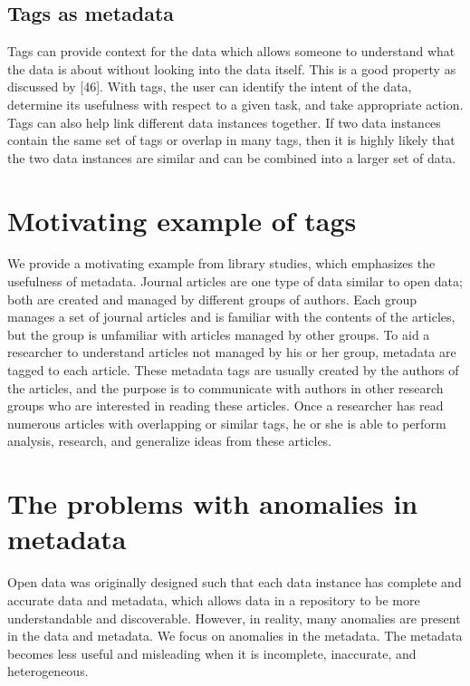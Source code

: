 \subsection{Tags as metadata}

Tags can provide context for the data which allows someone to understand what the data is about without looking into the data itself. This is a good property as discussed by [46]. With tags, the user can identify the intent of the data, determine its usefulness with respect to a given task, and take appropriate action. Tags can also help link different data instances together. If two data instances contain the same set of tags or overlap in many tags, then it is highly likely that the two data instances are similar and can be combined into a larger set of data.


\section{Motivating example of tags}
\label{sec:MotivatingExampleOfTags}

We provide a motivating example from library studies, which emphasizes the usefulness of metadata. Journal articles are one type of data similar to open data; both are created and managed by different groups of authors. Each group manages a set of journal articles and is familiar with the contents of the articles, but the group is unfamiliar with articles managed by other groups. To aid a researcher to understand articles not managed by his or her group, metadata are tagged to each article. These metadata tags are usually created by the authors of the articles, and the purpose is to communicate with authors in other research groups who are interested in reading these articles. Once a researcher has read numerous articles with overlapping or similar tags, he or she is able to perform analysis, research, and generalize ideas from these articles.

\section{The problems with anomalies in metadata}
\label{sec:TheProblemsWithAnomaliesInMetadata}

Open data was originally designed such that each data instance has complete and accurate data and metadata, which allows data in a repository to be more understandable and discoverable. However, in reality, many anomalies are present in the data and metadata. We focus on anomalies in the metadata. The metadata becomes less useful and misleading when it is incomplete, inaccurate, and heterogeneous.

